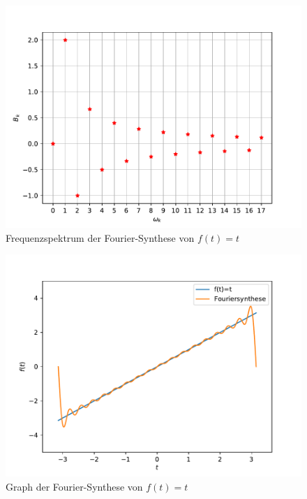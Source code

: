 \documentclass[titlepage = firstcover]{scrartcl}
\begin{document}
    \begin{figure}[H]
        \centering
        \includegraphics[width=0.9\linewidth]{Freqspek_y=x.pdf}
        \vspace{-5mm}
        \caption{Frequenzspektrum der Fourier-Synthese von $f(t)=t$}
    \end{figure}
    \begin{figure}[H]
        \centering
        \includegraphics[width=1.2\linewidth]{plot_x.pdf}
        \vspace{-10mm}
        \caption{Graph der Fourier-Synthese von $f(t)=t$}
    \end{figure}
\end{document}
